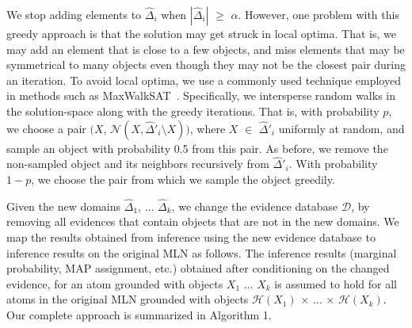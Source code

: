We stop adding elements to $\hat{\Delta}_i$ when $|\hat{\Delta}_i|$ $\geq$ $\alpha$. However, one problem with this greedy approach is that the solution may get struck in local optima. That is, we may add an element that is close to a few objects, and miss elements that may be symmetrical to many objects even though they may not be the closest pair during an iteration. To avoid local optima, we use a commonly used technique employed in methods such as MaxWalkSAT~\cite{kautz&al97b}. Specifically, we intersperse random walks in the solution-space along with the greedy iterations. That is, with probability $p$, we choose a pair $(X$, $\mathcal{N}(X,\hat{\Delta}'_i\setminus{X}))$, where $X$ $\in$ $\hat{\Delta}'_i$ uniformly at random, and sample an object with probability 0.5 from this pair. As before, we remove the non-sampled object and its neighbors recursively from $\hat{\Delta}'_i$. With probability $1-p$, we choose the pair from which we sample the object greedily.

Given the new domains $\hat{\Delta}_1$, $\ldots$ $\hat{\Delta}_k$, we change the evidence database $\mathcal{D}$, by removing all evidences that contain objects that are not in the new domains. We map the results obtained from inference using the new evidence database to inference results on the original MLN as follows. The inference results (marginal probability, MAP assignment, etc.) obtained after conditioning on the changed evidence, for an atom grounded with objects $X_1$ $\ldots$ $X_k$ is assumed to hold for all atoms in the original MLN grounded with objects $\mathcal{H}(X_1)$ $\times$ $\ldots$ $\times$ $\mathcal{H}(X_k)$.  Our complete approach is summarized in Algorithm 1.

